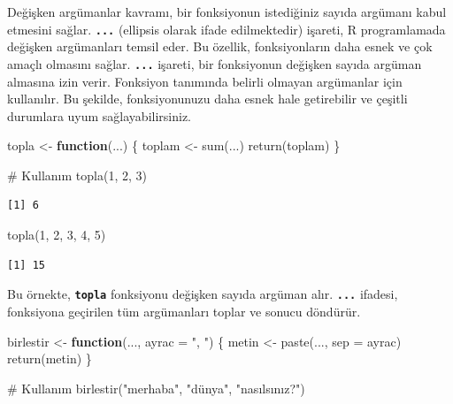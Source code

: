 \documentclass[
  letterpaper,
  DIV=11,
  numbers=noendperiod]{scrreprt}
\newenvironment{Shaded}{\begin{snugshade}}{\end{snugshade}}
\newcommand{\AttributeTok}[1]{\textcolor[rgb]{0.40,0.45,0.13}{#1}}
\newcommand{\CommentTok}[1]{\textcolor[rgb]{0.37,0.37,0.37}{#1}}
\newcommand{\ControlFlowTok}[1]{\textcolor[rgb]{0.00,0.23,0.31}{\textbf{#1}}}
\newcommand{\DecValTok}[1]{\textcolor[rgb]{0.68,0.00,0.00}{#1}}
\newcommand{\FunctionTok}[1]{\textcolor[rgb]{0.28,0.35,0.67}{#1}}
\newcommand{\NormalTok}[1]{\textcolor[rgb]{0.00,0.23,0.31}{#1}}
\newcommand{\OtherTok}[1]{\textcolor[rgb]{0.00,0.23,0.31}{#1}}
\newcommand{\StringTok}[1]{\textcolor[rgb]{0.13,0.47,0.30}{#1}}
\begin{document}
Değişken argümanlar kavramı, bir fonksiyonun istediğiniz sayıda argümanı
kabul etmesini sağlar. \textbf{\texttt{...}} (ellipsis olarak ifade
edilmektedir) işareti, R programlamada değişken argümanları temsil eder.
Bu özellik, fonksiyonların daha esnek ve çok amaçlı olmasını sağlar.
\textbf{\texttt{...}} işareti, bir fonksiyonun değişken sayıda argüman
almasına izin verir. Fonksiyon tanımında belirli olmayan argümanlar için
kullanılır. Bu şekilde, fonksiyonunuzu daha esnek hale getirebilir ve
çeşitli durumlara uyum sağlayabilirsiniz.

\begin{Shaded}
\begin{Highlighting}[]
\NormalTok{topla }\OtherTok{\textless{}{-}} \ControlFlowTok{function}\NormalTok{(...) \{}
\NormalTok{  toplam }\OtherTok{\textless{}{-}} \FunctionTok{sum}\NormalTok{(...)}
  \FunctionTok{return}\NormalTok{(toplam)}
\NormalTok{\}}

\CommentTok{\# Kullanım}
\FunctionTok{topla}\NormalTok{(}\DecValTok{1}\NormalTok{, }\DecValTok{2}\NormalTok{, }\DecValTok{3}\NormalTok{)}
\end{Highlighting}
\end{Shaded}

\begin{verbatim}
[1] 6
\end{verbatim}

\begin{Shaded}
\begin{Highlighting}[]
\FunctionTok{topla}\NormalTok{(}\DecValTok{1}\NormalTok{, }\DecValTok{2}\NormalTok{, }\DecValTok{3}\NormalTok{, }\DecValTok{4}\NormalTok{, }\DecValTok{5}\NormalTok{)}
\end{Highlighting}
\end{Shaded}

\begin{verbatim}
[1] 15
\end{verbatim}

Bu örnekte, \textbf{\texttt{topla}} fonksiyonu değişken sayıda argüman
alır. \textbf{\texttt{...}} ifadesi, fonksiyona geçirilen tüm
argümanları toplar ve sonucu döndürür.

\begin{Shaded}
\begin{Highlighting}[]
\NormalTok{birlestir }\OtherTok{\textless{}{-}} \ControlFlowTok{function}\NormalTok{(..., }\AttributeTok{ayrac =} \StringTok{", "}\NormalTok{) \{}
\NormalTok{  metin }\OtherTok{\textless{}{-}} \FunctionTok{paste}\NormalTok{(..., }\AttributeTok{sep =}\NormalTok{ ayrac)}
  \FunctionTok{return}\NormalTok{(metin)}
\NormalTok{\}}

\CommentTok{\# Kullanım}
\FunctionTok{birlestir}\NormalTok{(}\StringTok{"merhaba"}\NormalTok{, }\StringTok{"dünya"}\NormalTok{, }\StringTok{"nasılsınız?"}\NormalTok{)  }
\end{Highlighting}
\end{Shaded}
\end{document}
